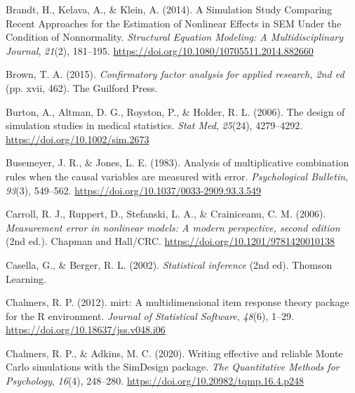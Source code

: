 \documentclass[
  man]{apa6}
\newlength{\cslhangindent}
\newlength{\cslentryspacingunit} %
\newenvironment{CSLReferences}[2] %
 {%
  \setlength{\parindent}{0pt}
  \ifodd #1
  \let\oldpar\par
  \def\par{\hangindent=\cslhangindent\oldpar}
  \fi
  \setlength{\parskip}{#2\cslentryspacingunit}
 }%
 {}
\begin{document}
\begin{CSLReferences}{1}{0}
\leavevmode{}%
Brandt, H., Kelava, A., \& Klein, A. (2014). A {Simulation Study Comparing Recent Approaches} for the {Estimation} of {Nonlinear Effects} in {SEM Under} the {Condition} of {Nonnormality}. \emph{Structural Equation Modeling: A Multidisciplinary Journal}, \emph{21}(2), 181--195. \url{https://doi.org/10.1080/10705511.2014.882660}

\leavevmode{}%
Brown, T. A. (2015). \emph{Confirmatory factor analysis for applied research, 2nd ed} (pp. xvii, 462). The Guilford Press.

\leavevmode{}%
Burton, A., Altman, D. G., Royston, P., \& Holder, R. L. (2006). The design of simulation studies in medical statistics. \emph{Stat Med}, \emph{25}(24), 4279--4292. \url{https://doi.org/10.1002/sim.2673}

\leavevmode{}%
Busemeyer, J. R., \& Jones, L. E. (1983). Analysis of multiplicative combination rules when the causal variables are measured with error. \emph{Psychological Bulletin}, \emph{93}(3), 549--562. \url{https://doi.org/10.1037/0033-2909.93.3.549}

\leavevmode{}%
Carroll, R. J., Ruppert, D., Stefanski, L. A., \& Crainiceanu, C. M. (2006). \emph{Measurement error in nonlinear models: {A} modern perspective, second edition} (2nd ed.). {Chapman and Hall/CRC}. \url{https://doi.org/10.1201/9781420010138}

\leavevmode{}%
Casella, G., \& Berger, R. L. (2002). \emph{Statistical inference} (2nd ed). Thomson Learning.

\leavevmode{}%
Chalmers, R. P. (2012). {mirt}: A multidimensional item response theory package for the {R} environment. \emph{Journal of Statistical Software}, \emph{48}(6), 1--29. \url{https://doi.org/10.18637/jss.v048.i06}

\leavevmode{}%
Chalmers, R. P., \& Adkins, M. C. (2020). Writing effective and reliable {Monte Carlo} simulations with the {SimDesign} package. \emph{The Quantitative Methods for Psychology}, \emph{16}(4), 248--280. \url{https://doi.org/10.20982/tqmp.16.4.p248}


\end{CSLReferences}
\end{document}
